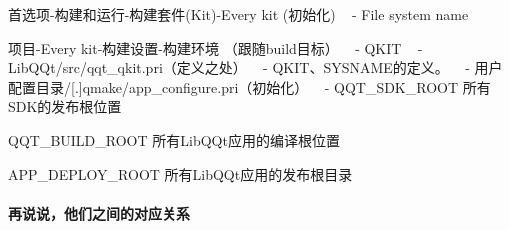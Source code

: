 \begin{DoxyItemize}
\item 首选项-\/构建和运行-\/构建套件(Kit)-\/\+Every kit (初始化) ~\newline
 -\/ File system name
\item 项目-\/\+Every kit-\/构建设置-\/构建环境 （跟随build目标） ~\newline
 -\/ Q\+K\+IT ~\newline
-\/ Lib\+Q\+Qt/src/qqt\+\_\+qkit.\+pri（定义之处） ~\newline
 -\/ Q\+K\+I\+T、\+S\+Y\+S\+N\+A\+M\+E的定义。 ~\newline
-\/ 用户配置目录/\mbox{[}.\mbox{]}qmake/app\+\_\+configure.\+pri（初始化） ~\newline
 -\/ Q\+Q\+T\+\_\+\+S\+D\+K\+\_\+\+R\+O\+OT 所有\+S\+D\+K的发布根位置
\begin{DoxyItemize}
\item Q\+Q\+T\+\_\+\+B\+U\+I\+L\+D\+\_\+\+R\+O\+OT 所有\+Lib\+Q\+Qt应用的编译根位置
\item A\+P\+P\+\_\+\+D\+E\+P\+L\+O\+Y\+\_\+\+R\+O\+OT 所有\+Lib\+Q\+Qt应用的发布根目录 ~\newline
 \paragraph*{再说说，他们之间的对应关系}
\end{DoxyItemize}
\end{DoxyItemize}

